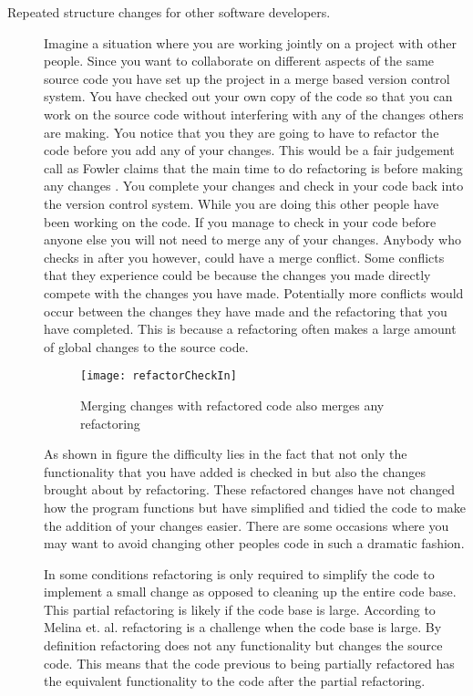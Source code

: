 \begin{description}
  \item [Repeated structure changes for other software developers.]   
    Imagine a situation where you are working jointly on a project with other people. Since you want to collaborate on different aspects of the same source code you have set up the project in a merge based version control system.  You have checked out your own copy of the code so that you can work on the source code without interfering with any of the changes others are making. You notice that you they are going to have to refactor the code before you add any of your changes.  This would be a fair judgement call as Fowler claims that the main time to do refactoring is before making any changes \cite{Fowler1999}. You complete your changes and check in your code back into the version control system.  While you are doing this other people have been working on the code.  If you manage to check in your code before anyone else you will not need to merge any of your changes.  Anybody who checks in after you however, could have a merge conflict.  Some conflicts that they experience could be because the changes you made directly compete with the changes you have made. Potentially more conflicts would occur between the changes they have made and the refactoring that you have completed. This is because a refactoring often makes a large amount of global changes to the source code.

    \begin{figure}
    \begin{center}
    \texttt{[image: refactorCheckIn]}
    \end{center}
    \caption{Merging changes with refactored code also merges any refactoring}
    \end{figure}

    As shown in figure the difficulty lies in the fact that not only the functionality that you have added is checked in but also the changes brought about by refactoring.  These refactored changes have not changed how the program functions but have simplified and tidied the code to make the addition of your changes easier. There are some occasions where you may want to avoid changing other peoples code in such a dramatic fashion.  

    In some conditions refactoring is only required to simplify the code to implement a small change as opposed to cleaning up the entire code base.  This partial refactoring is likely if the code base is large. According to Melina et. al. \cite{Milea2014} refactoring is a challenge when the code base is large. By definition refactoring does not any functionality but changes the source code. This means that the code previous to being partially refactored has the equivalent functionality to the code after the partial refactoring.


\end{description}
